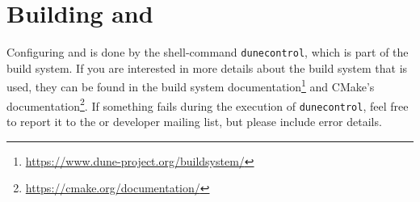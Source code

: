 %
%
%
%

\section{Building \Dune and \Dumux}
\label{buildIt}
Configuring \Dune and \Dumux is done by the shell-command \texttt{dunecontrol}, which is part of the \Dune build system.
If you are interested in more details about the build system that is used,
they can be found in the \Dune build system documentation\footnote{\url{https://www.dune-project.org/buildsystem/}} and
CMake's documentation\footnote{\url{https://cmake.org/documentation/}}.
If something fails during the execution of \texttt{dunecontrol}, feel free to report it to the \Dune or \Dumux developer mailing list,
but please include error details.

